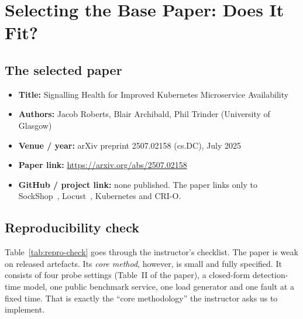 \documentclass[conference]{IEEEtran}
\begin{document}
\section{Selecting the Base Paper: Does It Fit?}
\label{sec:selection}
\subsection{The selected paper}
\begin{itemize}
\item \textbf{Title:} Signalling Health for Improved Kubernetes
  Microservice Availability~\cite{roberts2025}
\item \textbf{Authors:} Jacob Roberts, Blair Archibald, Phil Trinder
  (University of Glasgow)
\item \textbf{Venue / year:} arXiv preprint 2507.02158 (cs.DC), July 2025
\item \textbf{Paper link:} \url{https://arxiv.org/abs/2507.02158}
\item \textbf{GitHub / project link:} none published. The paper links
  only to SockShop~\cite{sockshop}, Locust~\cite{locust}, Kubernetes and
  CRI-O.
\end{itemize}

\subsection{Reproducibility check}
Table~\ref{tab:repro-check} goes through the instructor's checklist. The
paper is weak on released artefacts. Its \emph{core method}, however, is
small and fully specified. It consists of four probe settings
(Table~II of the paper), a closed-form detection-time model, one public
benchmark service, one load generator and one fault at a fixed time.
That is exactly the ``core methodology'' the instructor asks us to
implement.
\end{document}

